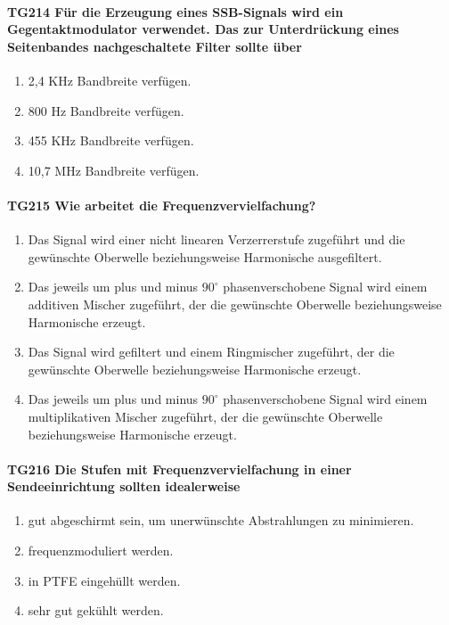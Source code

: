 \documentclass[8pt]{article}
\begin{document}
\paragraph*{TG214 Für die Erzeugung eines SSB-Signals wird ein Gegentaktmodulator verwendet. Das zur Unterdrückung eines Seitenbandes nachgeschaltete Filter sollte über}
\begin{enumerate}[nolistsep,label=\Alph*]
\item 2,4 KHz Bandbreite verfügen.
\item 800 Hz Bandbreite verfügen.
\item 455 KHz Bandbreite verfügen.
\item 10,7 MHz Bandbreite verfügen.
\end{enumerate}

\paragraph*{TG215 Wie arbeitet die Frequenzvervielfachung?}
\begin{enumerate}[nolistsep,label=\Alph*]
\item Das Signal wird einer nicht linearen Verzerrerstufe zugeführt und die gewünschte Oberwelle beziehungsweise Harmonische ausgefiltert. 
\item Das jeweils um plus und minus $90^{\circ}$ phasenverschobene Signal wird einem additiven Mischer zugeführt, der die gewünschte Oberwelle beziehungsweise Harmonische erzeugt.
\item Das Signal wird gefiltert und einem Ringmischer zugeführt, der die gewünschte Oberwelle beziehungsweise Harmonische erzeugt.
\item Das jeweils um plus und minus $90^{\circ}$ phasenverschobene Signal wird einem multiplikativen Mischer zugeführt, der die gewünschte Oberwelle beziehungsweise Harmonische erzeugt.
\end{enumerate}

\paragraph*{TG216 Die Stufen mit Frequenzvervielfachung in einer Sendeeinrichtung sollten idealerweise}
\begin{enumerate}[nolistsep,label=\Alph*]
\item gut abgeschirmt sein, um unerwünschte Abstrahlungen zu minimieren.
\item frequenzmoduliert werden.
\item in PTFE eingehüllt werden.
\item sehr gut gekühlt werden.
\end{enumerate}
\end{document}
